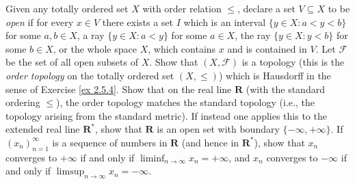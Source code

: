 \begin{exercise}\label{ex 2.5.5}
    Given any totally ordered set \(X\) with order relation \(\leq\), declare a set \(V \subseteq X\) to be \emph{open} if for every \(x \in V\) there exists a set \(I\) which is an interval \(\{y \in X : a < y < b\}\) for some \(a, b \in X\), a ray \(\{y \in X : a < y\}\) for some \(a \in X\), the ray \(\{y \in X : y < b\}\) for some \(b \in X\), or the whole space \(X\), which contains \(x\) and is contained in \(V\).
    Let \(\mathcal{F}\) be the set of all open subsets of \(X\).
    Show that \((X, \mathcal{F})\) is a topology (this is the \emph{order topology} on the totally ordered set \((X, \leq)\)) which is Hausdorff in the sense of Exercise \ref{ex 2.5.4}.
    Show that on the real line \(\mathbf{R}\) (with the standard ordering \(\leq\)), the order topology matches the standard topology (i.e., the topology arising from the standard metric).
    If instead one applies this to the extended real line \(\mathbf{R}^*\), show that \(\mathbf{R}\) is an open set with boundary \(\{-\infty, +\infty\}\).
    If \((x_n)_{n = 1}^\infty\) is a sequence of numbers in \(\mathbf{R}\) (and hence in \(\mathbf{R}^*\)), show that \(x_n\) converges to \(+\infty\) if and only if \(\liminf_{n \to \infty} x_n = +\infty\), and \(x_n\) converges to \(-\infty\) if and only if \(\limsup_{n \to \infty} x_n = -\infty\).
\end{exercise}


